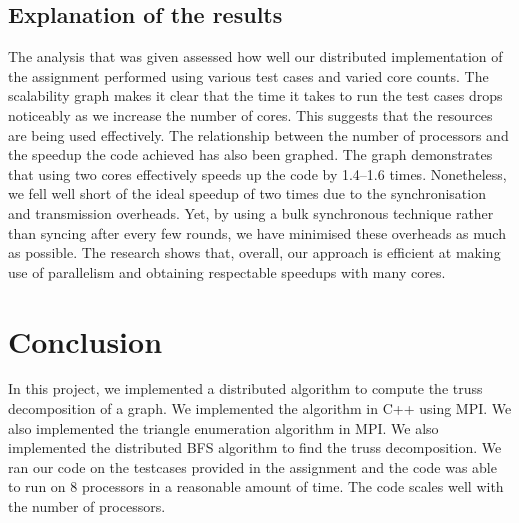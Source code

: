 \documentclass{article}
\begin{document}
\subsection{Explanation of the results}
The analysis that was given assessed how well our distributed implementation of the assignment performed using various test cases and varied core counts. The scalability graph makes it clear that the time it takes to run the test cases drops noticeably as we increase the number of cores. This suggests that the resources are being used effectively. The relationship between the number of processors and the speedup the code achieved has also been graphed. The graph demonstrates that using two cores effectively speeds up the code by 1.4–1.6 times. Nonetheless, we fell well short of the ideal speedup of two times due to the synchronisation and transmission overheads. Yet, by using a bulk synchronous technique rather than syncing after every few rounds, we have minimised these overheads as much as possible. The research shows that, overall, our approach is efficient at making use of parallelism and obtaining respectable speedups with many cores.

\section{Conclusion}

In this project, we implemented a distributed algorithm to compute the truss decomposition of a graph. We implemented the algorithm in C++ using MPI. We also implemented the triangle enumeration algorithm in MPI. We also implemented the distributed BFS algorithm to find the truss decomposition. We ran our code on the testcases provided in the assignment and the code was able to run on 8 processors in a reasonable amount of time. The code scales well with the number of processors.
\end{document}
